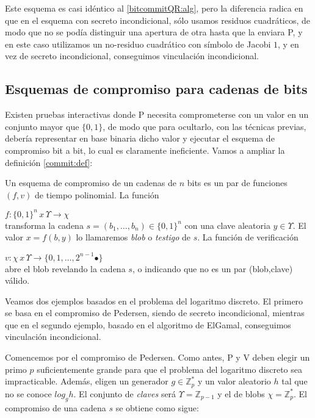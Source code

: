 Este esquema es casi idéntico al \ref{bitcommitQR:alg}, pero la diferencia radica en que en el esquema con secreto incondicional, sólo usamos residuos cuadráticos, de modo que no se podía distinguir una apertura de otra hasta que la enviara P, y en este caso utilizamos un no-residuo cuadrático con símbolo de Jacobi $1$, y en vez de secreto incondicional, conseguimos vinculación incondicional.


\hfil

\subsection{Esquemas de compromiso para cadenas de bits}

Existen pruebas interactivas donde P necesita comprometerse con un valor en un conjunto mayor que $\{0,1\}$, de modo que para ocultarlo, con las técnicas previas, debería representar en base binaria dicho valor y ejecutar el esquema de compromiso bit a bit, lo cual es claramente ineficiente. Vamos a ampliar la definición \ref{commit:def}:

\begin{definition}\label{commit:def2}
	Un esquema de compromiso de un cadenas de $n$ bits es un par de funciones $(f,v)$ de tiempo polinomial. La función
	
	$
	f:\{0,1\}^n\, x\, \Upsilon \to \chi
	$
	\\transforma la cadena $s=(b_1,\dots,b_n)\in \{0,1\}^n$ con una clave aleatoria $y\in \Upsilon$. El valor $x=f(b,y)$ lo llamaremos \textit{blob} o \textit{testigo} de $s$. La función de verificación
	
	$
	v:\chi \, x \, \Upsilon \to \{0,1,\dots,2^{n-1}\bullet\}
	$
	\\abre el blob revelando la cadena $s$, o indicando que no es un par (blob,clave) válido.
	
\end{definition}

\hfil

Veamos dos ejemplos basados en el problema del logaritmo discreto. El primero se basa en el compromiso de Pedersen, siendo de secreto incondicional, mientras que en el segundo ejemplo, basado en el algoritmo de ElGamal, conseguimos vinculación incondicional.


\hfil

Comencemos por el compromiso de Pedersen. Como antes, P y V deben elegir un primo $p$ suficientemente grande para que el problema del logaritmo discreto sea impracticable. Además, eligen un generador $g\in \mathbb{Z}_p^*$ y un valor aleatorio $h$ tal que no se conoce $log_g h$. El conjunto de \textit{claves} será $\Upsilon = \mathbb{Z}_{p-1}$ y el de blobs $\chi = \mathbb{Z}_p^*$. El compromiso de una cadena $s$ se obtiene como sigue:


